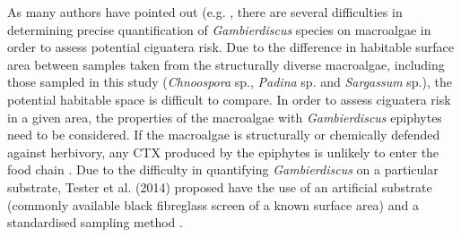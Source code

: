 \documentclass[12pt]{article}
\begin{document}

As many authors have pointed out (e.g. \cite{litaker2010global,bomber1989epiphytism,tester2014sampling,cruz2006macroalgal,parsons2011examination,globalcig,lobel1988assessment}, there are several difficulties in determining precise quantification of \textit{Gambierdiscus} species on macroalgae in order to assess potential ciguatera risk. Due to the difference in habitable surface area between samples taken from the structurally diverse macroalgae, including those sampled in this study (\emph{Chnoospora} sp., \emph{Padina} sp. and \emph{Sargassum} sp.), the potential habitable space is difficult to compare. In order to assess ciguatera risk in a given area, the properties of the macroalgae with \emph{Gambierdiscus} epiphytes need to be considered. If the macroalgae is structurally or chemically defended against herbivory, any CTX produced by the epiphytes is unlikely to enter the food chain \cite{cruz2006macroalgal}. Due to the difficulty in quantifying \emph{Gambierdiscus} on a particular substrate, Tester et al. (2014) proposed have the use of an artificial substrate (commonly available black fibreglass screen of a known surface area) and a standardised sampling method \cite{tester2014sampling}.
\end{document}
